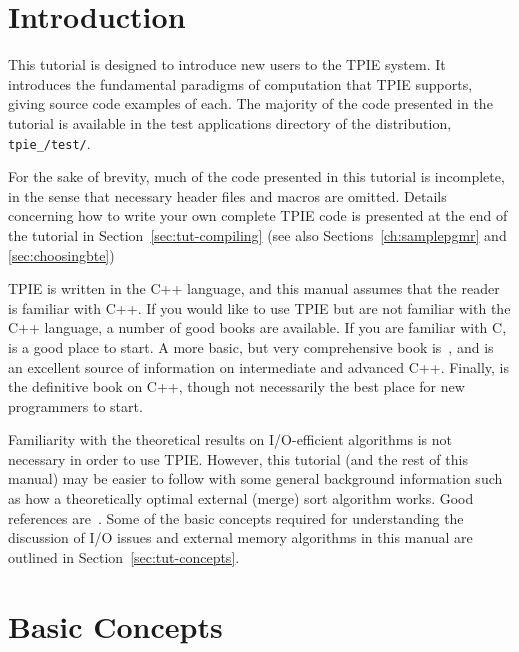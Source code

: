 \section{Introduction}

This tutorial is designed to introduce new users to the TPIE system.
It introduces the fundamental paradigms of computation that TPIE
supports, giving source code examples of each.  The majority of the
code presented in the tutorial is available in the test
applications directory of the distribution, 
{\tt tpie\_\version/test/}.

For the sake of brevity, much of the code presented in this tutorial is
incomplete, in the sense that necessary header files 
and macros are omitted. Details concerning how to write your
own complete TPIE code is presented at the end of the tutorial in
Section~\ref{sec:tut-compiling} (see also Sections~\ref{ch:samplepgmr} and
\ref{sec:choosingbte})

TPIE is written in the C++ language, and this manual assumes
that the reader is familiar with C++.  If you would like to
use TPIE but are not familiar with the C++
language, a number of good books are available. If you are
familiar with C, \cite{pohl:c++} is a good place to
start. A more basic, but very comprehensive book
is~\cite{deitel:c++}, and \cite{meyers:effective} is an
excellent source of information on intermediate and advanced
C++.  Finally, \cite{ellis:arm} is the definitive book on
C++, though not necessarily the best place for new
programmers to start.

Familiarity with the theoretical results on I/O-efficient
algorithms is not necessary in order to use TPIE. However,
this tutorial (and the rest of this manual) may be easier to
follow with some general background information such as how
a theoretically optimal external (merge) sort algorithm
works. Good references
are~\cite{vitter:podssurvey,arge:gisbook,aggarwal:input}.
Some of the basic concepts required for understanding the
discussion of I/O issues and external memory algorithms in
this manual are outlined in Section~\ref{sec:tut-concepts}.

\section{Basic Concepts}
   

